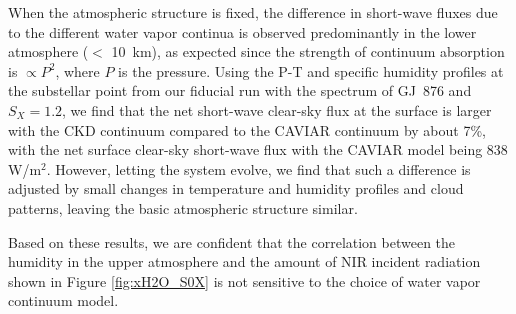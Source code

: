\documentclass[11pt,numberedappendix,twocolappendix,]{emulateapj}
\begin{document}
{When the atmospheric structure is fixed, the difference in short-wave fluxes due to the different water vapor continua is observed predominantly in the lower atmosphere ($<$ 10~km), as expected since the strength of continuum absorption is $\propto P^2$, where $P$ is the pressure. 
Using the P-T and specific humidity profiles at the substellar point from our fiducial run with the spectrum of GJ~876 and $S_X = 1.2$, we find that the net short-wave clear-sky flux at the surface is larger with the CKD continuum compared to the CAVIAR continuum by about 7\%, with the net surface clear-sky short-wave flux with the CAVIAR model being 838 W/m$^2$. 
However, letting the system evolve, we find that such a difference is adjusted by small changes in temperature and humidity profiles and cloud patterns, leaving the basic atmospheric structure similar. 


Based on these results, we are confident that the correlation between the humidity in the upper atmosphere and the amount of NIR incident radiation shown in Figure \ref{fig:xH2O_S0X} is not sensitive to the choice of water vapor continuum model.


%


}
\end{document}
